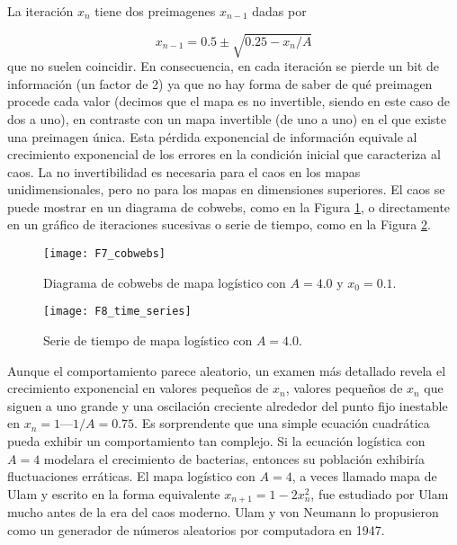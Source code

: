 \begin{itemize}
                    La iteración $x_{n}$ tiene dos preimagenes $x_{n-1}$ dadas por

                    \begin{equation}
                        x_{n-1} = 0.5 \pm \sqrt{0.25 - x_{n}/A} 
                    \end{equation}
                    que no suelen coincidir. En consecuencia, en cada iteración se pierde un bit de información (un factor de 2) ya que no hay forma de saber de qué preimagen procede cada valor (decimos que el mapa es no invertible, siendo en este caso de dos a uno), en contraste con un mapa invertible (de uno a uno) en el que existe una preimagen única. Esta pérdida exponencial de información equivale al crecimiento exponencial de los errores en la condición inicial que caracteriza al caos. La no invertibilidad es necesaria para el caos en los mapas unidimensionales, pero no para los mapas en dimensiones superiores. El caos se puede mostrar en un diagrama de cobwebs, como en la Figura \ref{fig:F7_cobwebs}, o directamente en un gráfico de iteraciones sucesivas o serie de tiempo, como en la Figura \ref{fig:F8_time_series}.

                    \begin{figure}[hbtp]
                        \caption{Diagrama de cobwebs de mapa logístico con $A = 4.0$ y $x_{0} = 0.1$.}
                        \centering
                        \texttt{[image: F7\_cobwebs]}
                        \label{fig:F7_cobwebs}
                    \end{figure}

                    \begin{figure}[hbtp]
                        \caption{Serie de tiempo de mapa logístico con $A = 4.0$.}
                        \centering
                        \texttt{[image: F8\_time\_series]}
                        \label{fig:F8_time_series}
                    \end{figure}

                    Aunque el comportamiento parece aleatorio, un examen más detallado revela el crecimiento exponencial en valores pequeños de $x_{n}$, valores pequeños de $x_{n}$ que siguen a uno grande y una oscilación creciente alrededor del punto fijo inestable en $x_{n} = 1 — 1/A = 0.75$. Es sorprendente que una simple ecuación cuadrática pueda exhibir un comportamiento tan complejo. Si la ecuación logística con $A = 4$ modelara el crecimiento de bacterias, entonces su población exhibiría fluctuaciones erráticas. El mapa logístico con $A = 4$, a veces llamado mapa de Ulam y escrito en la forma equivalente $x_{n+1} = 1 - 2 x_{n}^{2}$, fue estudiado por Ulam mucho antes de la era del caos moderno. Ulam y von Neumann lo propusieron como un generador de números aleatorios por computadora en 1947.


\end{itemize}
